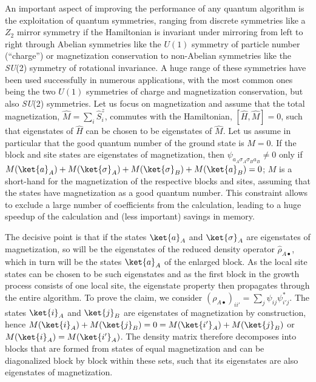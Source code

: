 An important aspect of improving the performance of any quantum algorithm is the exploitation of quantum symmetries, ranging from discrete symmetries like a $Z_2$ mirror symmetry if the Hamiltonian is invariant under mirroring from left to right through Abelian symmetries like the $U(1)$ symmetry of particle number (``charge'') or magnetization conservation to non-Abelian symmetries like the {\em SU}(2) symmetry of rotational invariance\cite{McCulloch07,SierraNishino97,McCulloch00,McCulloch01,McCulloch02}. A huge range of these symmetries have been used successfully in numerous applications, with the most common ones being the two $U(1)$ symmetries of charge and magnetization conservation, but also {\em SU}(2) symmetries\cite{McCulloch08a,Smerat09,Langer09,Holzner09}. Let us focus on magnetization and assume that the total magnetization, $\hat{M} = \sum_i \hat{S}^z_i$, commutes with the Hamiltonian, $[\hat{H},\hat{M}]=0$, such that eigenstates of $\hat{H}$ can be chosen to be eigenstates of $\hat{M}$. Let us assume in particular that the good quantum number of the ground state is $M=0$. If the block and site states are eigenstates of magnetization, then $\psi_{a_A \sigma_A \sigma_B a_B} \neq 0$ only if $M (\ket{a}_A) +  M (\ket{\sigma}_A) + M (\ket{\sigma}_B) + M (\ket{a}_B) = 0$;
$M$ is a short-hand for the magnetization of the respective blocks and sites, assuming that the states have magnetization as a good quantum number. This constraint allows to exclude a large number of coefficients from the calculation, leading to a huge speedup of the calculation and (less important) savings in memory.

The decisive point is that if the states $\ket{a}_A$ and $\ket{\sigma}_A$ are eigenstates of magnetization, so will be the eigenstates of the reduced density operator $\hat{\rho}_{A\bullet}$, which in turn will be the states $\ket{a}_A$ of the enlarged block. As the local site states can be chosen to be such eigenstates and as the first block in the growth process consists of one local site, the eigenstate property then propagates through the entire algorithm. To prove the claim, we consider $(\rho_{A\bullet})_{ii'} = \sum_j \psi_{ij} \psi^*_{i'j}$. The states $\ket{i}_A$ and $\ket{j}_B$ are eigenstates of magnetization by construction, hence 
$M (\ket{i}_A) + M(\ket{j}_B) = 0 = M (\ket{i'}_A) + M (\ket{j}_B)$ or $M (\ket{i}_A) = M (\ket{i'}_A)$. The density matrix therefore decomposes into blocks that are formed from states of equal magnetization and can be diagonalized block by block within these sets, such that its eigenstates are also eigenstates of magnetization.

